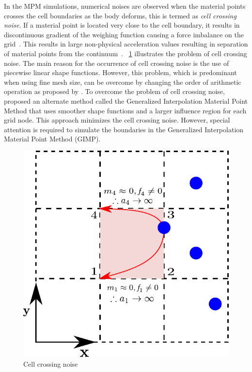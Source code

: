 In the MPM simulations, numerical noises are observed when the material points 
crosses the cell boundaries as the body deforms, this is termed 
as \textit{cell crossing noise}. If a material point is located very close to 
the cell boundary, it results in discontinuous gradient of the weighing 
function causing a force imbalance on the grid~\citep{bardenhagen2004}. This 
results in large non-physical acceleration values resulting in separation of 
material points from the continuum~\citep{Sulsky1995}. 
~\cref{fig:cellnoise} illustrates the problem of cell crossing noise. The 
main reason for the occurrence of cell crossing noise is the use of piecewise 
linear shape functions. However, this problem, which is predominant when using 
fine mesh size, can be overcome by changing the order of arithmetic operation 
as proposed by \citet{Sulsky1995}. To overcome the problem of cell crossing 
noise, \citet{bardenhagen2004} proposed an alternate method called the 
Generalized Interpolation Material Point Method that uses smoother shape 
functions and a larger influence region for each grid node. This approach 
minimizes the cell crossing noise. However, special attention is required to 
simulate the boundaries in the Generalized Interpolation Material Point Method 
(GIMP).
\begin{figure}[htbp]
\centering
\includegraphics{cellnoise}
\caption{Cell crossing noise}
\label{fig:cellnoise}
\end{figure}


